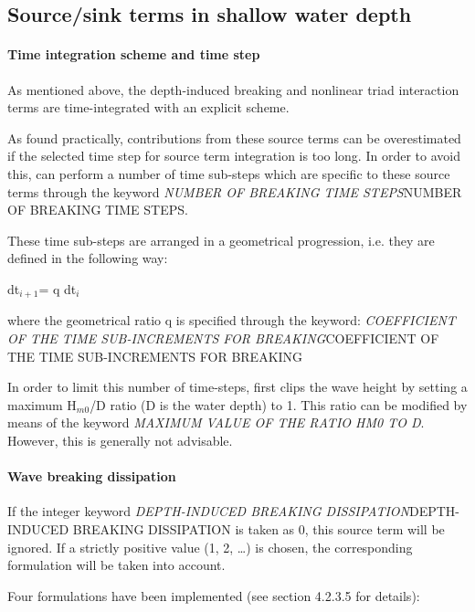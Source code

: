 \subsection{ Source/sink terms in shallow water depth}


\paragraph{ Time integration scheme and time step}

 As mentioned above, the depth-induced breaking and nonlinear triad interaction terms are time-integrated with an explicit scheme.

 As found practically, contributions from these source terms can be overestimated if the selected time step for source term integration is too long. In order to avoid this, \tomawac can perform a number of time sub-steps which are specific to these source terms through the keyword \textit{NUMBER OF BREAKING TIME STEPS}NUMBER OF BREAKING TIME STEPS.

 These time sub-steps are arranged in a geometrical progression, i.e. they are defined in the following way:

dt${}_{i+1 }$= q dt${}_{i}$

 where the geometrical ratio q is specified through the keyword: \textit{COEFFICIENT OF THE TIME SUB-INCREMENTS FOR BREAKING}COEFFICIENT OF THE TIME SUB-INCREMENTS FOR BREAKING

 In order to limit this number of time-steps, \tomawac first clips the wave height by setting a maximum H${}_{m0}$/D ratio (D is the water depth) to 1. This ratio can be modified by means of the keyword \textit{MAXIMUM VALUE OF THE RATIO HM0 TO D}. However, this is generally not advisable.


\paragraph{ Wave breaking dissipation}

 If the integer keyword \textit{DEPTH-INDUCED BREAKING DISSIPATION}DEPTH-INDUCED BREAKING DISSIPATION\textit{ }is taken as 0, this source term will be ignored. If a strictly positive value (1, 2, \dots ) is chosen, the corresponding formulation will be taken into account.

 Four formulations have been implemented (see section 4.2.3.5 for details):



 \textbf{}

